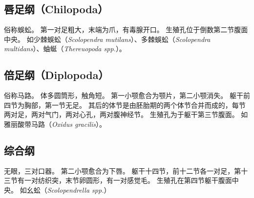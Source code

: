 \documentclass[11pt]{article}
\begin{document}
\subsection{唇足纲（Chilopoda）}
俗称蜈蚣。
第一对足粗大，末端为爪，有毒腺开口。
生殖孔位于倒数第二节腹面中央。
如少棘蜈蚣（\textit{Scolopendra mutilans}）、多棘蜈蚣（\textit{Scolopendra multidans}）、蚰蜒（\textit{Thereuopoda spp.}）。

\subsection{倍足纲（Diplopoda）}
俗称马路。
体多圆筒形，触角短。
第一小颚愈合为颚片，第二小颚消失。
躯干前四节为胸部，第一节无足。
其后的体节是由胚胎期的两个体节合并而成的，每节两对足，两对气门，两对心孔，两对腹神经节。
生殖孔为于躯干第三节腹面。
如雅丽酸带马路（\textit{Oxidus gracilis}）。

\subsection{综合纲}
无眼，三对口器。
第二小颚愈合为下唇。
躯干十四节，前十二节各一对足，第十三节有一对纺织突，末节卵圆形，有一对感觉毛。
生殖孔在第四节躯干腹面中央。
如幺蚣（\textit{Scolopendrella spp.}）
\end{document}
